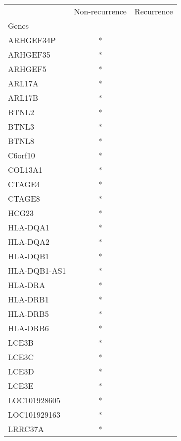 \begin{tabular}{lcc}
\toprule
{} & Non-recurrence & Recurrence \\
Genes        &                &            \\
\midrule
ARHGEF34P    &              * &            \\
ARHGEF35     &              * &            \\
ARHGEF5      &              * &            \\
ARL17A       &              * &            \\
ARL17B       &              * &            \\
BTNL2        &              * &            \\
BTNL3        &              * &            \\
BTNL8        &              * &            \\
C6orf10      &              * &            \\
COL13A1      &              * &            \\
CTAGE4       &              * &            \\
CTAGE8       &              * &            \\
HCG23        &              * &            \\
HLA-DQA1     &              * &            \\
HLA-DQA2     &              * &            \\
HLA-DQB1     &              * &            \\
HLA-DQB1-AS1 &              * &            \\
HLA-DRA      &              * &            \\
HLA-DRB1     &              * &            \\
HLA-DRB5     &              * &            \\
HLA-DRB6     &              * &            \\
LCE3B        &              * &            \\
LCE3C        &              * &            \\
LCE3D        &              * &            \\
LCE3E        &              * &            \\
LOC101928605 &              * &            \\
LOC101929163 &              * &            \\
LRRC37A      &              * &            \\

\end{tabular}
